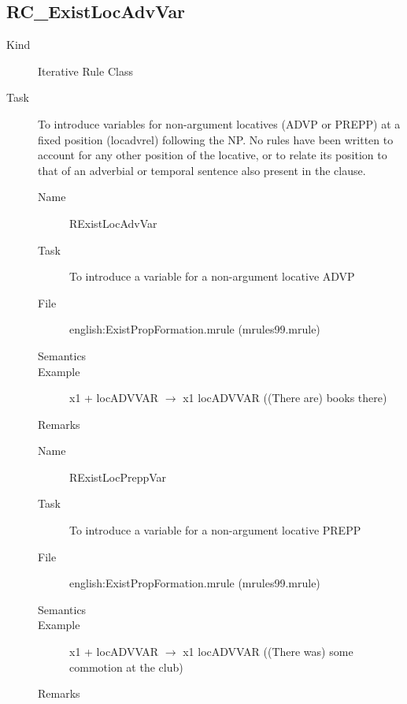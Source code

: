 \newpage
\subsection{RC\_ExistLocAdvVar}
\begin{description}
\item[Kind] Iterative Rule Class
\item[Task] To introduce variables for non-argument locatives (ADVP or PREPP) 
at a fixed position (locadvrel) following the NP. No rules have been 
written to account for any other position 
of the locative, or to relate its position to that of an adverbial or temporal 
sentence also present in the clause.

\vspace{1 cm}
\begin{description}
\item[Name] RExistLocAdvVar
\item[Task] To introduce a variable for a non-argument locative ADVP 
\item[File] english:ExistPropFormation.mrule (mrules99.mrule)
\item[Semantics]
\item[Example] x1 + locADVVAR $\rightarrow$ x1 locADVVAR
((There are) books there)
\item[Remarks]
\end{description}

\vspace{1 cm}
\begin{description}
\item[Name] RExistLocPreppVar
\item[Task] To introduce a variable for a non-argument locative PREPP
\item[File] english:ExistPropFormation.mrule (mrules99.mrule)
\item[Semantics]
\item[Example] x1 + locADVVAR $\rightarrow$ x1 locADVVAR
((There was) some commotion at the club)
\item[Remarks]
\end{description}

\end{description}



